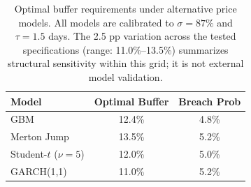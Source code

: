 \begin{table}[t]
\centering
\footnotesize
\caption{Optimal buffer requirements under alternative price models. All models are calibrated to $\sigma = 87\%$ and $\tau = 1.5$ days. The 2.5 pp variation across the tested specifications (range: 11.0\%--13.5\%) summarizes structural sensitivity within this grid; it is not external model validation.}
\label{tab:robustness_models}
\begin{tabular}{l c c}
\hline
Model & Optimal Buffer & Breach Prob \\
\hline
GBM & 12.4\% & 4.8\% \\
Merton Jump & 13.5\% & 5.2\% \\
Student-$t$ ($\nu{=}5$) & 12.0\% & 5.0\% \\
GARCH(1,1) & 11.0\% & 5.2\% \\
\hline
\end{tabular}
\end{table}
